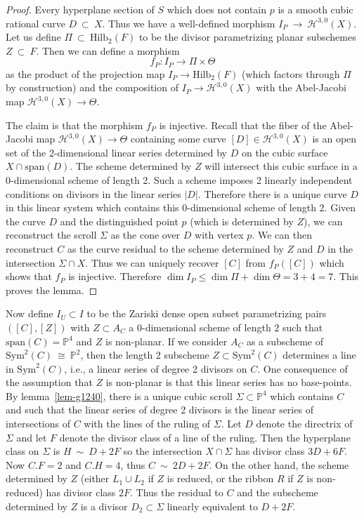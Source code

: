 \documentclass[twoside,12pt,reqno]{amsart}
\theoremstyle{plain}
\theoremstyle{definition}
\newcommand{\Hdg}[2]{\mathcal{H}^{#1,#2}}
\newcommand{\PP}{\mathbb{P}}
\newcommand{\HI}[2]{\text{Hilb}_{#1}(#2)}
\def\ps{\vspace{4pt}}
\begin{document}
\begin{proof}
\ps

Every hyperplane section of $S$ which does not contain $p$ is a
smooth cubic rational curve $D~\subset~ X$.  Thus we have a well-defined 
morphism $I_P~\rightarrow~ \Hdg{3}{0}(X)$.  Let us define $\Pi~\subset~
\HI{2}{F}$ to be the divisor parametrizing planar subschemes $Z~\subset~ 
F$.  Then we can define a morphism 
\begin{equation}
f_P: I_P \rightarrow  \Pi\times \Theta
\end{equation}
as the product of the projection map $I_P\rightarrow \HI{2}{F}$ (which 
factors through $\Pi$ by construction) and the composition of
$I_P\rightarrow \Hdg{3}{0}(X)$ with the Abel-Jacobi map
$\Hdg{3}{0}(X)\rightarrow \Theta$.  

\ps

The claim is that the morphism $f_P$ is injective.  Recall that the
fiber of the Abel-Jacobi map $\Hdg{3}{0}(X)\rightarrow \Theta$
containing some curve $[D]\in \Hdg{3}{0}(X)$ is an open set of the
2-dimensional linear series determined by $D$ on the cubic surface
$X\cap \text{span}(D)$.  The scheme determined by $Z$ will intersect
this cubic surface in a 0-dimensional scheme of length 2.  Such a
scheme imposes 2 linearly independent conditions on divisors in the
linear series $|D|$.  Therefore there is a unique curve $D$ in this
linear system which contains this 0-dimensional scheme of length 2.
Given the curve $D$ and the distinguished point $p$ (which is
determined by $Z$), we can reconstruct the scroll $\Sigma$ as the cone 
over $D$ with vertex $p$.  We can then reconstruct $C$ as the
curve residual to the scheme determined by $Z$ and $D$ in the
intersection $\Sigma\cap X$.  Thus we can uniquely recover $[C]$ from
$f_P([C])$ which shows that $f_P$ is injective.  Therefore
$\dim I_P \leq \dim  \Pi + \dim  \Theta = 3 + 4 = 7$.
This proves the lemma.
\end{proof}

Now define $I_U \subset I$ to be the Zariski dense open subset
parametrizing pairs $([C],[Z])$ with $Z\subset A_C$ a 0-dimensional
scheme of length $2$ such that $\text{span}(C)=\PP^4$ and $Z$ is
non-planar.  If we consider $A_C$ as a subscheme of
$\text{Sym}^2(C)~\cong~\PP^2$, then the length 2 subscheme $Z\subset
\text{Sym}^2(C)$ determines a line in $\text{Sym}^2(C)$, i.e., a linear 
series of degree 2 divisors on $C$.  One consequence of the assumption 
that $Z$ is non-planar is that this linear series has no base-points.
By lemma~\ref{lem-g1240}, there is a unique cubic scroll
$\Sigma\subset \PP^4$ which contains $C$ and such that the linear
series of degree 2 divisors is the linear series of intersections of
$C$ with the lines of the ruling of $\Sigma$.  Let $D$ denote the
directrix of $\Sigma$ and let $F$ denote the divisor class of a line
of the ruling.  Then the hyperplane class on $\Sigma$ is $H~\sim~D+2F$ 
so the intersection $X\cap \Sigma$ has divisor class $3D+6F$.  Now
$C.F=2$ and $C.H = 4$, thus $C~\sim~ 2D+2F$.  On the other hand, the scheme
determined by $Z$ (either $L_1\cup L_2$ if $Z$ is reduced, or the
ribbon $R$ if $Z$ is non-reduced) has divisor class $2F$.  Thus the
residual to $C$ and the subscheme determined by $Z$ is a divisor
$D_2\subset \Sigma$
linearly equivalent to $D+2F$.
\end{document}
